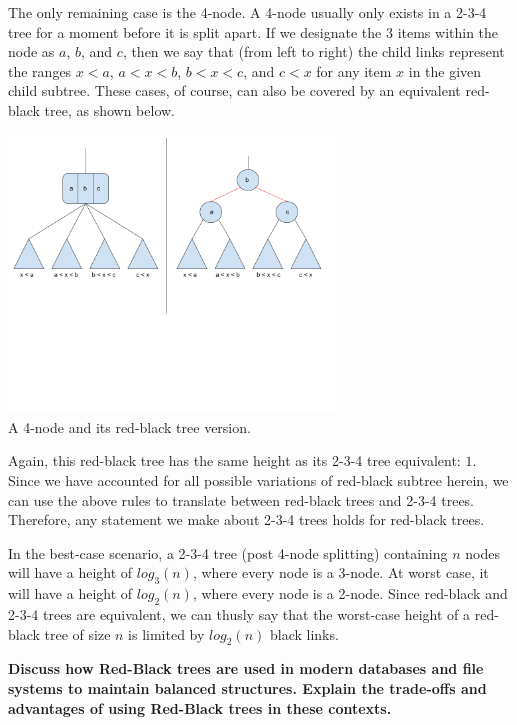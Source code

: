 \documentclass[12pt]{amsart}
\begin{document}
    The only remaining case is the 4-node. A 4-node usually only
    exists in a 2-3-4 tree for a moment before it is split
    apart. If we designate the $3$ items within the node as
    $a$, $b$, and $c$, then we say that (from left to right) the
    child links represent the ranges $x < a$, $a < x < b$,
    $b < x < c$, and $c < x$ for any item $x$ in the given
    child subtree. These cases, of course, can also be covered
    by an equivalent red-black tree, as shown below.

\begin{center}
    \includegraphics[width=0.65\textwidth]{rb_tree_2} \\
    A 4-node and its red-black tree version. \\
    \vskip 1cm
\end{center}

    Again, this red-black tree has the same height as its 2-3-4
    tree equivalent: $1$. Since we have accounted for all
    possible variations of red-black subtree herein, we can use
    the above rules to translate between red-black trees and
    2-3-4 trees. Therefore, any statement we make about 2-3-4
    trees holds for red-black trees.

    In the best-case scenario, a 2-3-4 tree (post 4-node
    splitting) containing $n$ nodes will have a height of
    $log_3(n)$, where every node is a 3-node. At worst case, it
    will have a height of $log_2(n)$, where every node is a
    2-node. Since red-black and 2-3-4 trees are equivalent, we
    can thusly say that the worst-case height of a red-black
    tree of size $n$ is limited by $log_2(n)$ black links.

    \newpage
    \textbf{Discuss how Red-Black trees are used in modern
    databases and file systems to maintain balanced structures.
    Explain the trade-offs and advantages of using Red-Black
    trees in these contexts.}
\end{document}
